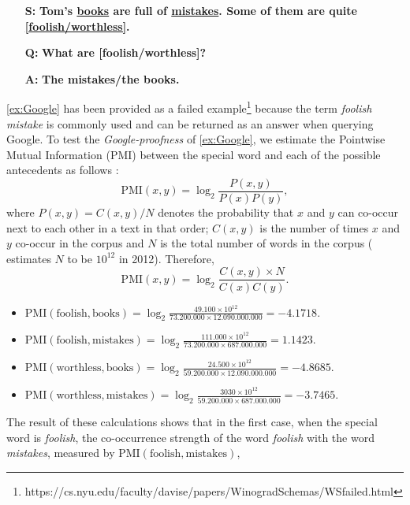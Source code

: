 \begin{itemize} 
	\item[\textbf{S:}] \textbf{Tom's \underline{books} are full of \underline{mistakes}. Some of them are quite \underline{[foolish/worthless]}.}
	\item[\textbf{Q:}] \textbf{What are [foolish/worthless]?}
	\item[\textbf{A:}] \textbf{The mistakes/the books.} 
\end{itemize} 


\ref{ex:Google} has been provided as a failed example\footnote{https://cs.nyu.edu/faculty/davise/papers/WinogradSchemas/WSfailed.html} because the term \textit{foolish mistake} is commonly used and can be returned as an answer when querying Google.
To test the \textit{Google-proofness} of \ref{ex:Google}, we estimate the Pointwise Mutual Information (PMI) between the special word and each of the possible antecedents as follows \cite{google, Church}:
\begin{equation}
\text{PMI}\left(x,y\right) = \log_2\frac{P\left(x,y\right)}{P\left(x\right)P\left(y\right)},
\end{equation}
where $P\left(x,y\right)=C\left(x,y\right)/N$ denotes the probability that $x$ and $y$ can co-occur next to each other in a text in that order; $C\left(x,y\right)$ is the number of times $x$ and $y$ co-occur in the corpus and $N$ is the total number of words in the corpus (\cite{google} estimates $N$ to be $10^{12}$ in 2012). Therefore,
\begin{equation}
	\text{PMI}\left(x,y\right)=\log_2\frac{C\left(x,y\right)\times N}{C\left(x\right)C\left(y\right)}.
\end{equation}
\begin{itemize}
	\item $\text{PMI}\left(\text{foolish},\text{books}\right)=\log_2\frac{49.100\times10^{12}}{73.200.000\times12.090.000.000}=-4.1718$.
	\item $\text{PMI}\left(\text{foolish},\text{mistakes}\right)=\log_2\frac{111.000\times10^{12}}{73.200.000\times687.000.000 }=1.1423$.
	\item $\text{PMI}\left(\text{worthless},\text{books}\right)=\log_2\frac{24.500\times10^{12}}{59.200.000\times12.090.000.000}=-4.8685$.
	\item $\text{PMI}\left(\text{worthless},\text{mistakes}\right)=\log_2\frac{3030\times10^{12}}{59.200.000\times687.000.000}=-3.7465$.
\end{itemize}
The result of these calculations shows that in the first case, when the special word is \textit{foolish}, the co-occurrence strength of the word \textit{foolish} with the word \textit{mistakes}, measured by $\text{PMI}\left(\text{foolish},\text{mistakes}\right)$,
